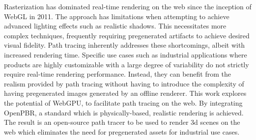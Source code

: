 
Rasterization has dominated real-time rendering on the web since the inception of WebGL in 2011. The approach has limitations when attempting to achieve advanced lighting effects such as realistic shadows. This necessitates more complex techniques, frequently requiring pregenerated artifacts to achieve desired visual fidelity. Path tracing inherently addresses these shortcomings, albeit with increased rendering time. Specific use cases such as industrial applications where products are highly customizable with a large degree of variability do not strictly require real-time rendering performance. Instead, they can benefit from the realism provided by path tracing without having to introduce the complexity of having pregenerated images generated by an offline renderer. This work explores the potential of WebGPU, to facilitate path tracing on the web. By integrating OpenPBR, a standard which is physically-based, realistic rendering is achieved. The result is an open-source path tracer to be used to render 3d scenes on the web which eliminates the need for pregenerated assets for industrial use cases.
